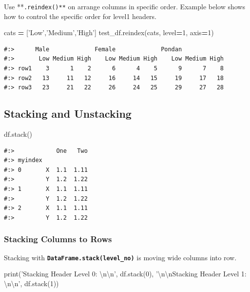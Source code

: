 \documentclass[
]{book}
\newenvironment{Shaded}{\begin{snugshade}}{\end{snugshade}}
\newcommand{\BuiltInTok}[1]{#1}
\newcommand{\CharTok}[1]{\textcolor[rgb]{0.5,0.5,0.5}{#1}}
\newcommand{\DecValTok}[1]{\textcolor[rgb]{0.06,0.06,0.06}{#1}}
\newcommand{\NormalTok}[1]{#1}
\newcommand{\OperatorTok}[1]{\textcolor[rgb]{0.43,0.43,0.43}{\textbf{#1}}}
\newcommand{\StringTok}[1]{\textcolor[rgb]{0.5,0.5,0.5}{#1}}
\begin{document}
Use **\texttt{.reindex()**} on arrange columns in specific order. Example below shows how to control the specific order for level1 headers.

\begin{Shaded}
\begin{Highlighting}[]
\NormalTok{cats }\OperatorTok{=}\NormalTok{ [}\StringTok{'Low'}\NormalTok{,}\StringTok{'Medium'}\NormalTok{,}\StringTok{'High'}\NormalTok{]}
\NormalTok{test_df.reindex(cats, level}\OperatorTok{=}\DecValTok{1}\NormalTok{, axis}\OperatorTok{=}\DecValTok{1}\NormalTok{)}
\end{Highlighting}
\end{Shaded}

\begin{verbatim}
#:>      Male             Female             Pondan            
#:>       Low Medium High    Low Medium High    Low Medium High
#:> row1    3      1    2      6      4    5      9      7    8
#:> row2   13     11   12     16     14   15     19     17   18
#:> row3   23     21   22     26     24   25     29     27   28
\end{verbatim}

\hypertarget{stacking-and-unstacking}{%
\subsection{Stacking and Unstacking}\label{stacking-and-unstacking}}

\begin{Shaded}
\begin{Highlighting}[]
\NormalTok{df.stack()}
\end{Highlighting}
\end{Shaded}

\begin{verbatim}
#:>            One   Two
#:> myindex             
#:> 0       X  1.1  1.11
#:>         Y  1.2  1.22
#:> 1       X  1.1  1.11
#:>         Y  1.2  1.22
#:> 2       X  1.1  1.11
#:>         Y  1.2  1.22
\end{verbatim}

\hypertarget{stacking-columns-to-rows}{%
\subsubsection{Stacking Columns to Rows}\label{stacking-columns-to-rows}}

Stacking with \textbf{\texttt{DataFrame.stack(level\_no)}} is moving wide columns into row.

\begin{Shaded}
\begin{Highlighting}[]
\BuiltInTok{print}\NormalTok{(}\StringTok{'Stacking Header Level 0: }\CharTok{\textbackslash{}n\textbackslash{}n}\StringTok{'}\NormalTok{, df.stack(}\DecValTok{0}\NormalTok{),}
      \StringTok{'}\CharTok{\textbackslash{}n\textbackslash{}n}\StringTok{Stacking Header Level 1: }\CharTok{\textbackslash{}n\textbackslash{}n}\StringTok{'}\NormalTok{, df.stack(}\DecValTok{1}\NormalTok{))}
\end{Highlighting}
\end{Shaded}
\end{document}
